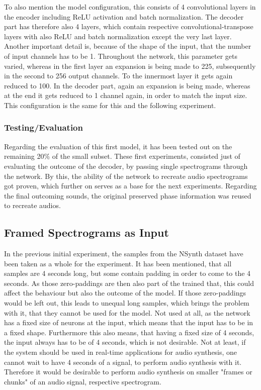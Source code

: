 To also mention the model configuration, this consists of 4 convolutional layers in the encoder including ReLU activation and batch normalization. The decoder part has therefore also 4 layers, which contain respective convolutional-transpose layers with also ReLU and batch normalization except the very last layer. Another important detail is, because of the shape of the input, that the number of input channels has to be 1. Throughout the network, this parameter gets varied, whereas in the first layer an expansion is being made to 225, subsequently in the second to 256 output channels. To the innermost layer it gets again reduced to 100. In the decoder part, again an expansion is being made, whereas at the end it gets reduced to 1 channel again, in order to match the input size. This configuration is the same for this and the following experiment.

\subsubsection{Testing/Evaluation}
Regarding the evaluation of this first model, it has been tested out on the remaining 20\% of the small subset. These first experiments, consisted just of evaluating the outcome of the decoder, by passing single spectrograms through the network. By this, the ability of the network to recreate audio spectrograms got proven, which further on serves as a base for the next experiments. Regarding the final outcoming sounds, the original preserved phase information was reused to recreate audios.

\subsection{Framed Spectrograms as Input}
In the previous initial experiment, the samples from the NSynth dataset have been taken as a whole for the experiment. It has been mentioned, that all samples are 4 seconds long, but some contain padding in order to come to the 4 seconds. As those zero-paddings are then also part of the trained that, this could affect the behaviour but also the outcome of the model. If those zero-paddings would be left out, this leads to unequal long samples, which brings the problem with it, that they cannot be used for the model. Not used at all, as the network has a fixed size of neurons at the input, which means that the input has to be in a fixed shape. Furthermore this also means, that having a fixed size of 4 seconds, the input always has to be of 4 seconds, which is not desirable. Not at least, if the system should be used in real-time applications for audio synthesis, one cannot wait to have 4 seconds of a signal, to perform audio synthesis with it. Therefore it would be desirable to perform audio synthesis on smaller "frames or chunks" of an audio signal, respective spectrogram. 

